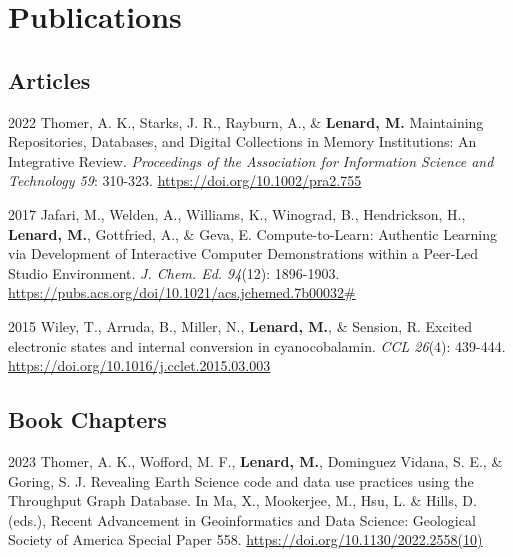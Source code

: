 \documentclass[12pt,letterpaper]{report}
\begin{document}
\section*{Publications}

\subsection*{Articles}

\begin{tablist}
   
        \item[2022] \tab Thomer, A. K., Starks, J. R., Rayburn, A., \& \textbf{Lenard, M.} Maintaining Repositories, Databases, and Digital Collections in Memory Institutions: An Integrative Review. \textit{Proceedings of the Association for Information Science and Technology 59}: 310-323. \href{https://doi.org/10.1002/pra2.755}{https://doi.org/10.1002/pra2.755}
        
        \item[2017] \tab Jafari, M., Welden, A., Williams, K., Winograd, B., Hendrickson, H., \textbf{Lenard, M.}, Gottfried, A., \& Geva, E. Compute-to-Learn: Authentic Learning via Development of Interactive Computer Demonstrations within a Peer-Led Studio Environment. \textit{J. Chem. Ed. 94}(12): 1896-1903. \href{https://pubs.acs.org/doi/10.1021/acs.jchemed.7b00032\#}{https://pubs.acs.org/doi/10.1021/acs.jchemed.7b00032\#}

        \item[2015] \tab Wiley, T., Arruda, B., Miller, N., \textbf{Lenard, M.}, \& Sension, R. Excited electronic states and internal conversion in cyanocobalamin. \textit{CCL 26}(4): 439-444. \href{https://doi.org/10.1016/j.cclet.2015.03.003}{https://doi.org/10.1016/j.cclet.2015.03.003}

\end{tablist}

\subsection*{Book Chapters}

\begin{tablist}

	\item[2023] \tab Thomer, A. K., Wofford, M. F., \textbf{Lenard, M.}, Dominguez Vidana, S. E., \& Goring, S. J. Revealing Earth Science code and data use practices using the Throughput Graph Database. In Ma, X., Mookerjee, M., Hsu, L. \& Hills, D. (eds.), Recent Advancement in Geoinformatics and Data Science: Geological Society 
of America Special Paper 558. \href{https://doi.org/10.1130/2022.2558(10)}{https://doi.org/10.1130/2022.2558(10)}
	
\end{tablist}
\end{document}
